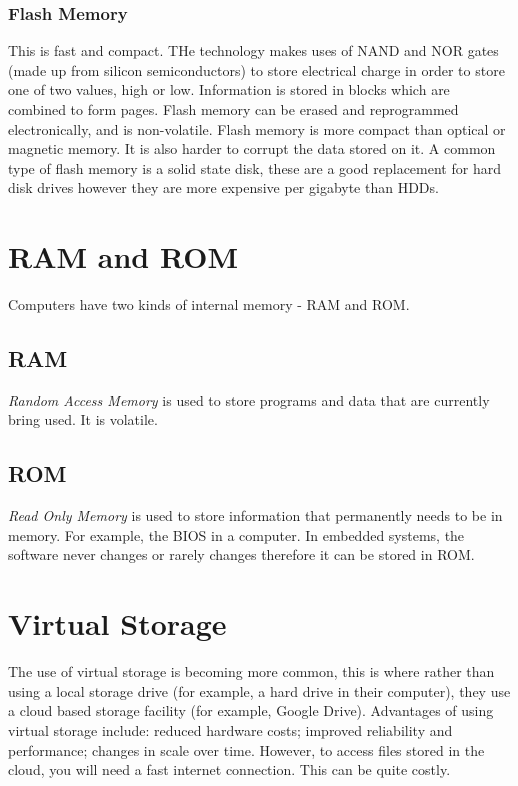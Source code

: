 \documentclass[a4paper,11pt, twocolumn]{article}
\begin{document}
\subsubsection{Flash Memory}
This is fast and compact. THe technology makes uses of NAND and NOR gates (made up from silicon semiconductors) to store electrical charge in order to store one of two values, high or low. Information is stored in blocks which are combined to form pages. Flash memory can be erased and reprogrammed electronically, and is non-volatile. Flash memory is more compact than optical or magnetic memory. It is also harder to corrupt the data stored on it. A common type of flash memory is a solid state disk, these are a good replacement for hard disk drives however they are more expensive per gigabyte than HDDs.

\section{RAM and ROM}
Computers have two kinds of internal memory - RAM and ROM.
\subsection{RAM}
\textit{Random Access Memory} is used to store programs and data that are currently bring used. It is volatile.
\subsection{ROM}
\textit{Read Only Memory} is used to store information that permanently needs to be in memory. For example, the BIOS in a computer. In embedded systems, the software never changes or rarely changes therefore it can be stored in ROM.

\section{Virtual Storage}
The use of virtual storage is becoming more common, this is where rather than using a local storage drive (for example, a hard drive in their computer), they use a cloud based storage facility (for example, Google Drive). Advantages of using virtual storage include: reduced hardware costs; improved reliability and performance; changes in scale over time. However, to access files stored in the cloud, you will need a fast internet connection. This can be quite costly. 
\end{document}

